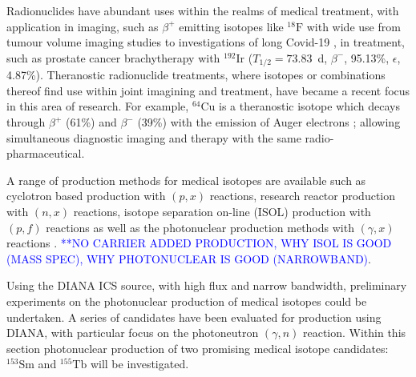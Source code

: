 \documentclass[../main.tex]{subfiles}
\begin{document}
Radionuclides have abundant uses within the realms of medical treatment, with application in imaging, such as $\beta^{+}$ emitting isotopes like $^{18}\mathrm{F}$ with wide use from tumour volume imaging studies \cite{rocha2021metabolic} to investigations of long Covid-19 \cite{sollini2021long}, in treatment, such as prostate cancer brachytherapy \cite{yuan2021proof} with $^{192}\textrm{Ir}$ ($T_{1/2} =73.83$~\si{\day}, $\beta^{-}$, 95.13\%, $\epsilon$, 4.87\%). Theranostic \cite{svenson2013theranostics} radionuclide treatments, where isotopes or combinations thereof find use within joint imagining and treatment, have became a recent focus in this area of research. For example, $^{64}\mathrm{Cu}$ is a theranostic isotope which decays through $\beta^{+}$ (61\%) and $\beta^{-}$ (39\%) with the emission of Auger electrons \cite{boschi2018emerging}; allowing simultaneous diagnostic imaging and therapy with the same radio-pharmaceutical.

A range of production methods for medical isotopes are available such as cyclotron based production \cite{} with $\left(p,x\right)$ reactions, research reactor production \cite{} with $\left(n,x\right)$ reactions, isotope separation on-line (ISOL) production with $\left(p,f\right)$ reactions \cite{} as well as the photonuclear production methods with $\left(\gamma,x\right)$ reactions \cite{habs2011production}. \textcolor{blue}{**NO CARRIER ADDED PRODUCTION, WHY ISOL IS GOOD (MASS SPEC), WHY PHOTONUCLEAR IS GOOD (NARROWBAND)}. 

Using the DIANA ICS source, with high flux and narrow bandwidth, preliminary experiments on the photonuclear production of medical isotopes could be undertaken. A series of candidates have been evaluated for production using DIANA, with particular focus on the photoneutron $\left(\gamma,n\right)$ reaction. Within this section photonuclear production of two promising medical isotope candidates: $^{153}\mathrm{Sm}$ and $^{155}\mathrm{Tb}$ will be investigated.  
\end{document}
